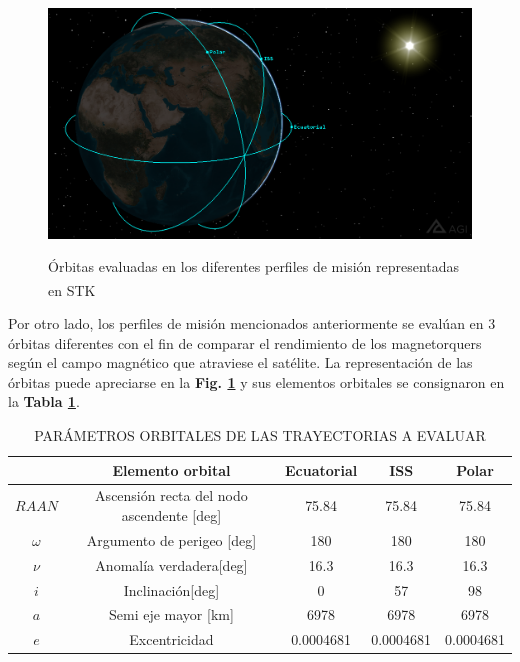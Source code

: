 \begin{figure}[!h]
	\begin{center}
		\includegraphics[scale=0.40]{imagenes/resultados/orbitas.PNG}\\
	\end{center}
	\caption{Órbitas evaluadas en los diferentes perfiles de misión representadas en STK\textsuperscript{\tiny\textregistered}}
	\label{fig:orbitas_eval}	 	
\end{figure}

Por otro lado, los perfiles de misión mencionados anteriormente se evalúan en 3 órbitas diferentes con el fin de comparar el rendimiento de los magnetorquers según el campo magnético que atraviese el satélite. La representación de las órbitas puede apreciarse en la \textbf{Fig. \ref{fig:orbitas_eval}} y sus elementos orbitales se consignaron en la \textbf{Tabla \ref{table:Parametros_orbitales}}.





\begin{table}[!ht]
	\caption{\MakeUppercase{Parámetros Orbitales de las trayectorias a evaluar }}
	\begin{center}
		\begin{tabular}{ c c c c c}
			
			&  \textbf{Elemento orbital} &  \textbf{Ecuatorial} & \textbf{ISS }& \textbf{Polar}\\ \hline
			\noindent$RAAN$& Ascensión recta del nodo ascendente [deg] &75.84 & 75.84 & 75.84 \\
			$\omega$& Argumento de perigeo [deg] & 180& 180 & 180 \\
			$\nu$&Anomalía verdadera[deg] &16.3 & 16.3 &16.3\\
			$i$&Inclinación[deg] & 0 & 57 &98\\
			$a$&Semi eje mayor [km] & 6978  & 6978&6978\\
			$e$&Excentricidad &0.0004681 &0.0004681 & 0.0004681 \\ \hline			
		\end{tabular}
	\end{center}
	\label{table:Parametros_orbitales}
\end{table}

